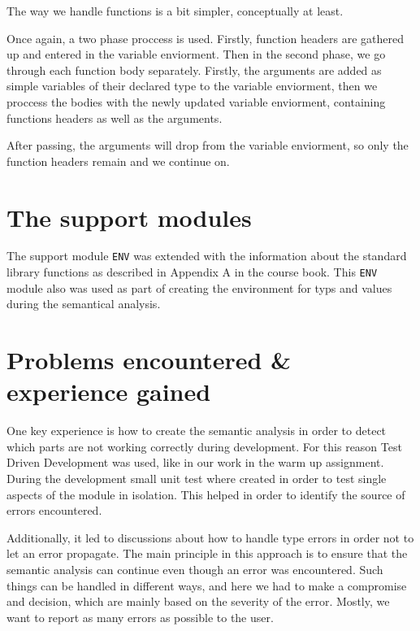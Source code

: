 \documentclass{article}
\begin{document}
The way we handle functions is a bit simpler, conceptually at least.

Once again, a two phase proccess is used. Firstly, function headers are gathered up and entered in the variable enviorment. Then in the second phase,
we go through each function body separately. Firstly, the arguments are added as simple variables of their declared type to the 
variable enviorment, then we proccess the bodies with the newly updated variable enviorment, containing functions headers as
well as the arguments.

After passing, the arguments will drop from the variable enviorment, so only the function headers remain and we continue on.

\section{The support modules}

The support module \texttt{ENV} was extended with the information about the standard library functions as described in Appendix A in the course book. This \texttt{ENV} module also was used as part of creating the environment for typs and values during the semantical analysis. 


\section{Problems encountered \& experience gained}

One key experience is how to create the semantic analysis in order to detect which parts are not working correctly during development. For this reason Test Driven Development was used, like in our work in the warm up assignment. During the development small unit test where created in order to test single aspects of the module in isolation. This helped in order to identify the source of errors encountered.

Additionally, it led to discussions about how to handle type errors in order not to let an error propagate. The main principle in this approach is to ensure that the semantic analysis can continue even though an error was encountered. Such things can be handled in different ways, and here we had to make a compromise and decision, which are mainly based on the severity of the error. Mostly, we want to report as many errors as possible to the user.
\end{document}
